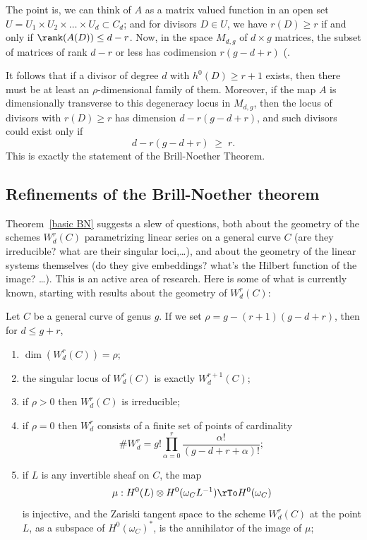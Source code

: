 The point is, we can think of $A$ as a matrix valued function in an open set $U = U_1 \times U_2 \times \dots \times U_d \subset C_d$; and for divisors $D \in U$, we have $r(D) \geq r$ if and only if $\rank(A(D)) \leq d-r$. Now, in the space $M_{d,g}$ of $d \times g$ matrices, the subset of matrices of rank $d-r$ or less has codimension $r(g-d+r)$ (\cite[Theorem ****]{Eisenbud1995}. 

It follows 
that if  a divisor of degree $d$ with $h^0(D) \geq r+1$ exists, then there must be at least an $\rho$-dimensional family of them. Moreover, if the map $A$ is dimensionally transverse to this degeneracy locus in $M_{d,g}$, then the locus of divisors with $r(D) \geq r$ has dimension $d - r(g-d+r)$, and such divisors could exist only if
$$
d - r(g-d+r) \; \geq \; r.
$$
This is exactly the statement of the Brill-Noether Theorem.


\subsection{Refinements of the Brill-Noether theorem}

Theorem~\ref{basic BN} suggests a slew of questions, both about the geometry of the schemes $W^r_d(C)$ parametrizing linear series on a general curve $C$ (are they irreducible? what are their singular loci,\dots), and about the geometry of the linear systems themselves (do they give embeddings? what's the Hilbert function of the image? \dots). This is an active area of research. Here is some of what is currently known, starting with results about the geometry of $W^r_d(C)$:

\begin{theorem}\label{Wrd omnibus }
Let $C$ be a general curve of genus $g$. If we set $\rho = g - (r+1)(g-d+r)$, then for $d \leq g+r$,
\begin{enumerate}
\item $\dim(W^r_d(C)) = \rho$;
\item\label{sing wrd} the singular locus of $W^r_d(C)$ is exactly $W^{r+1}_d(C)$;
\item\label{irr wrd} if $\rho > 0$ then $W^r_d(C)$ is irreducible;
\item\label{rho=0} if $\rho = 0$ then $W^r_d$ consists of a finite set of  points of cardinality
$$
\#W^r_d = g! \prod_{\alpha=0}^r \frac{\alpha!}{(g-d+r+\alpha)!};
$$
\item\label{Petri} if $L$ is any invertible sheaf on $C$, the map
$$
\mu : H^0(L) \otimes H^0(\omega_CL^{-1}) \rTo H^0(\omega_C)
$$
is injective, and the Zariski tangent space to the scheme $W^r_d(C)$ at the point $L$, as a subspace
of $H^0(\omega_C)^*$, is the annihilator of the image of $\mu$;
\end{enumerate}
\end{theorem}


